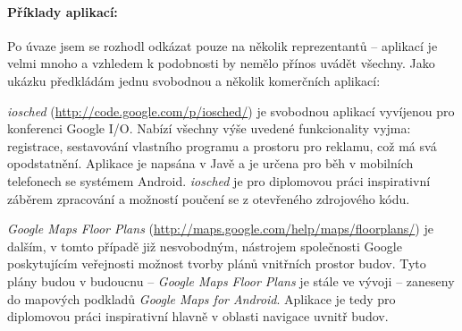 \paragraph{Příklady aplikací:}
Po úvaze jsem se rozhodl odkázat pouze na několik reprezentantů -- aplikací je velmi mnoho a vzhledem k podobnosti by nemělo přínos uvádět všechny. Jako ukázku předkládám jednu svobodnou a několik komerčních aplikací:

\emph{iosched} (\url{http://code.google.com/p/iosched/}) je svobodnou aplikací vyvíjenou pro konferenci Google I/O. Nabízí všechny výše uvedené funkcionality vyjma: registrace, sestavování vlastního programu a prostoru pro reklamu, což má svá opodstatnění. Aplikace je napsána v Javě a je určena pro běh v mobilních telefonech se systémem Android. \emph{iosched} je pro diplomovou práci inspirativní záběrem zpracování a možností poučení se z otevřeného zdrojového kódu.

\textit{Google Maps Floor Plans} (\url{http://maps.google.com/help/maps/floorplans/}) je dalším, v tomto případě již nesvobodným, nástrojem společnosti Google poskytujícím veřejnosti možnost tvorby plánů vnitřních prostor budov. Tyto plány budou v budoucnu -- \emph{Google Maps Floor Plans} je stále ve vývoji -- zaneseny do mapových podkladů \emph{Google Maps for Android}. Aplikace je tedy pro diplomovou práci inspirativní hlavně v oblasti navigace uvnitř budov.
